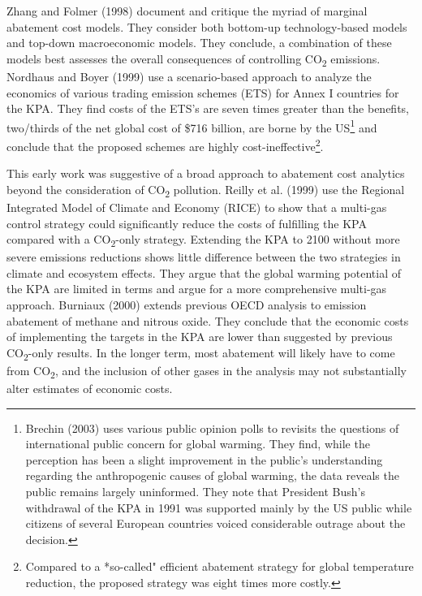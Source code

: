 \documentclass[
  10pt,
]{article}
\begin{document}
Zhang and Folmer (1998) document and critique the myriad of marginal
abatement cost models. They consider both bottom-up technology-based
models and top-down macroeconomic models. They conclude, a combination
of these models best assesses the overall consequences of controlling
CO\textsubscript{2} emissions. Nordhaus and Boyer (1999) use a
scenario-based approach to analyze the economics of various trading
emission schemes (ETS) for Annex I countries for the KPA. They find
costs of the ETS's are seven times greater than the benefits, two/thirds
of the net global cost of \$716 billion, are borne by the US\footnote{Brechin
  (2003) uses various public opinion polls to revisits the questions of
  international public concern for global warming. They find, while the
  perception has been a slight improvement in the public's understanding
  regarding the anthropogenic causes of global warming, the data reveals
  the public remains largely uninformed. They note that President Bush's
  withdrawal of the KPA in 1991 was supported mainly by the US public
  while citizens of several European countries voiced considerable
  outrage about the decision.} and conclude that the proposed schemes
are highly cost-ineffective\footnote{Compared to a *so-called" efficient
  abatement strategy for global temperature reduction, the proposed
  strategy was eight times more costly.}.

This early work was suggestive of a broad approach to abatement cost
analytics beyond the consideration of CO\textsubscript{2} pollution.
Reilly et al. (1999) use the Regional Integrated Model of Climate and
Economy (RICE) to show that a multi-gas control strategy could
significantly reduce the costs of fulfilling the KPA compared with a
CO\textsubscript{2}-only strategy. Extending the KPA to 2100 without
more severe emissions reductions shows little difference between the two
strategies in climate and ecosystem effects. They argue that the global
warming potential of the KPA are limited in terms and argue for a more
comprehensive multi-gas approach. Burniaux (2000) extends previous OECD
analysis to emission abatement of methane and nitrous oxide. They
conclude that the economic costs of implementing the targets in the KPA
are lower than suggested by previous CO\textsubscript{2}-only results.
In the longer term, most abatement will likely have to come from
CO\textsubscript{2}, and the inclusion of other gases in the analysis
may not substantially alter estimates of economic costs.
\end{document}
